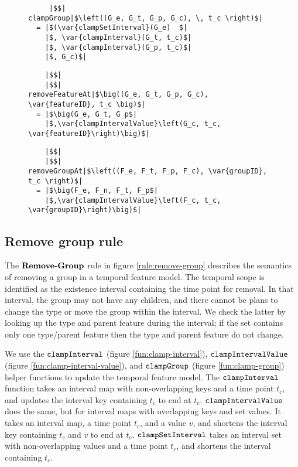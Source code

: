 \begin{figure}
\begin{minipage}{0.5\textwidth}
  \begin{verbatim}
     |$$|
clampGroup|$\left((G_e, G_t, G_p, G_c), \, t_c \right)$|
  = |$(\var{clampSetInterval}(G_e)  $|
    |$, \var{clampInterval}(G_t, t_c)$|
    |$, \var{clampInterval}(G_p, t_c)$|
    |$, G_c)$|
  \end{verbatim}
\end{minipage}

\begin{minipage}{0.6\textwidth}
  \begin{verbatim}
    |$$|
    |$$|
removeFeatureAt|$\big((G_e, G_t, G_p, G_c), \var{featureID}, t_c \big)$|
  = |$\big(G_e, G_t, G_p$|
    |$,\var{clampIntervalValue}\left(G_c, t_c, \var{featureID}\right)\big)$|
  \end{verbatim}
\end{minipage}

\begin{minipage}{0.6\textwidth}
  \begin{verbatim}
    |$$|
    |$$|
removeGroupAt|$\left((F_e, F_t, F_p, F_c), \var{groupID}, t_c \right)$|
  = |$\big(F_e, F_n, F_t, F_p$|
    |$,\var{clampIntervalValue}\left(F_c, t_c, \var{groupID}\right)\big)$|
  \end{verbatim}
\end{minipage}
\end{figure}

\subsection{Remove group rule}
\label{sub:remove-group-rule}
The $\textbf{Remove-Group}$ rule in figure \vref{rule:remove-group} describes the semantics of removing a group in a temporal feature model. The temporal scope is identified as the existence interval containing the time point for removal. In that interval, the group may not have any children, and there cannot be plans to change the type or move the group within the interval. We check the latter by looking up the type and parent feature during the interval; if the set contains only one type/parent feature then the type and parent feature do not change. 

We use the $\texttt{clampInterval}$ (figure \vref{fun:clamp-interval}), $\texttt{clampIntervalValue}$ (figure \vref{fun:clamp-interval-value}), and $\texttt{clampGroup}$ (figure \vref{fun:clamp-group}) helper functions to update the temporal feature model.  The $\texttt{clampInterval}$ function takes an interval map with non-overlapping keys and a time point $t_c$, and updates the interval key containing $t_c$ to end at $t_c$. $\texttt{clampIntervalValue}$ does the same, but for interval maps with overlapping keys and set values. It takes an interval map, a time point $t_c$, and a value $v$, and shortens the interval key containing $t_c$ and $v$ to end at $t_c$. $\texttt{clampSetInterval}$ takes an interval set with non-overlapping values and a time point $t_c$, and shortens the interval containing $t_c$. 


